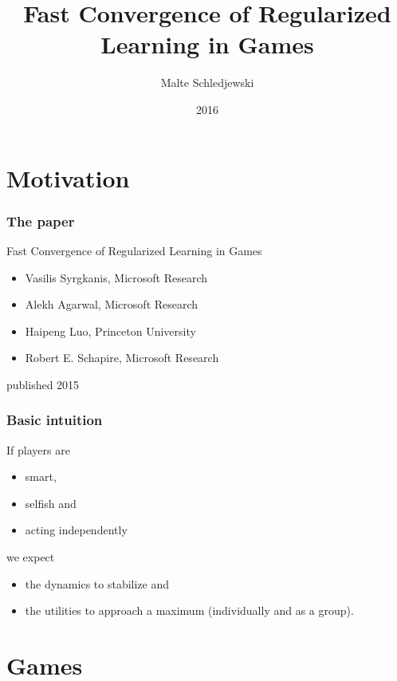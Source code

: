 \documentclass{beamer}
\title{Fast Convergence of Regularized Learning in Games}
\author{Malte Schledjewski}
\institute{Saarbrücken Graduate School of Computer Science}
\date{2016}
\begin{document}
	
\frame{\titlepage}

\section{Motivation}

\begin{frame}
	\frametitle{The paper}
	\begin{block}{Fast Convergence of Regularized Learning in Games}
		\begin{itemize}
			\item Vasilis Syrgkanis, Microsoft Research
			\item Alekh Agarwal, Microsoft Research
			\item Haipeng Luo, Princeton University
			\item Robert E. Schapire, Microsoft Research
		\end{itemize}
		published 2015
	\end{block}
\end{frame}

\begin{frame}
	\frametitle{Basic intuition}
    If players are
		\begin{itemize}
			\item smart,
			\item selfish and
			\item acting independently
		\end{itemize}
		
	we expect
	\begin{itemize}
		\item the dynamics to stabilize and
		\item the utilities to approach a maximum (individually and as a group).
	\end{itemize}
\end{frame}




\section{Games}
\end{document}
